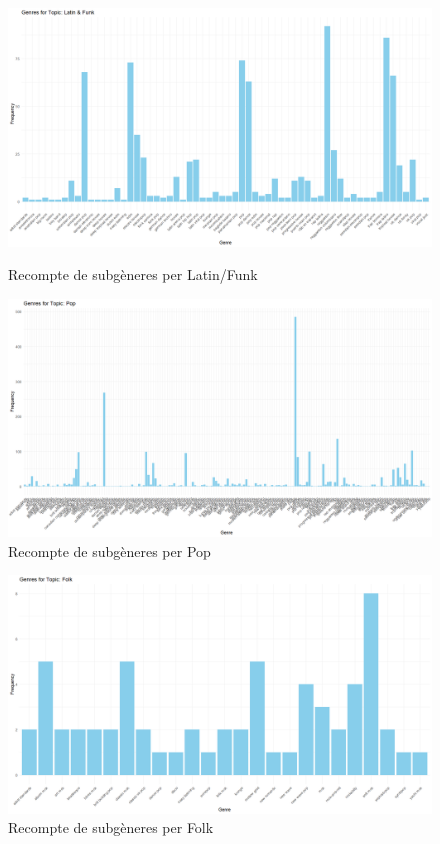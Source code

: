 \begin{figure}[H]
    \centering
    \begin{minipage}{.4\textwidth}
        \centering
        \includegraphics[width=0.95\linewidth]{Images//8_Textual//Genres/Latin & Funk_subgenres_freq.png}
    \caption{Recompte de subgèneres per Latin/Funk}
    \label{fig:textual_genres_sublatlin}
    \end{minipage}%
    \begin{minipage}{.4\textwidth}
        \centering
        \includegraphics[width=0.95\linewidth]{Images//8_Textual//Genres/Pop_subgenres_freq.png}
    \caption{Recompte de subgèneres per Pop}
    \label{fig:textual_genres_subpop}
    \end{minipage}%
\end{figure}

\begin{figure}[H]
    \centering
    \includegraphics[width=0.5\linewidth]{Images//8_Textual//Genres/Folk_subgenres_freq.png}
    \caption{Recompte de subgèneres per Folk}
    \label{fig:textual_genres_subfolk}
\end{figure}

